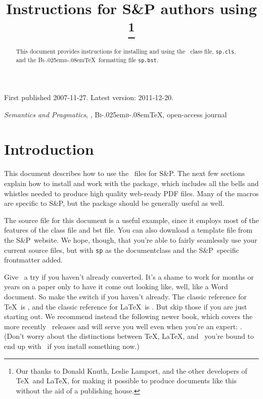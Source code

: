 \documentclass[lucida,final]{sp}
\title[S\&P instructions for \LaTeXe]{Instructions for S\&P authors using \LaTeXe%
  \thanks{Our thanks to Donald Knuth, Leslie
    Lamport, and the other developers of \TeX\ and \LaTeX, for making
    it possible to produce documents like this without the aid of a
    publishing house.}}
\author[von Fintel, Potts \& Shan]{%
  \spauthor{Kai von Fintel \\ \institute{Massachusetts Institute of Technology}} \AND
  \spauthor{Christopher Potts \\ \institute{University of Massachusetts Amherst}} \AND
  \spauthor{Chung-chieh Shan \\ \institute{Rutgers University}}%
}
\makeatletter
\newcommand{\BibTeX}{B{\textsc i\kern-.025em\textsc b}\kern-.08em\TeX}
\newcommand{\SandP}{S\&P\@}
\newcommand{\spfile}[1]{\texttt{#1}}
\makeatother
\begin{document}

\maketitle

\begin{mshistory}
First published 2007-11-27. Latest version: 2011-12-20.
\end{mshistory}

\begin{abstract}
  This document provides instructions for installing and using the
  \LaTeXe\ class file, \spfile{sp.cls}, and the \BibTeX\ formatting
  file \spfile{sp.bst}.
\end{abstract}

\begin{keywords}
  \emph{Semantics and Pragmatics}, \LaTeXe, \BibTeX, open-access journal
\end{keywords}


\section{Introduction}

This document describes how to use the \LaTeXe\ files for \SandP.  The
next few sections explain how to install and work with the package,
which includes all the bells and whistles needed to produce high
quality web-ready PDF files.  Many of the macros are specific to
\SandP, but the package should be generally useful as well.

The source file for this document is a useful example, since it
employs most of the features of the class file and bst file.  You can
also download a template file from the \SandP\ website.  We hope,
though, that you're able to fairly seamlessly use your current source
files, but with \spfile{sp} as the documentclass and the \SandP\
specific frontmatter added.

Give \LaTeXe\ a try if you haven't already converted.  It's a shame to
work for months or years on a paper only to have it come out looking
like, well, like a Word document.  So make the switch if you haven't
already.  The classic reference for \TeX\ is \citealt{Knuth84TeXBook},
and the classic reference for \LaTeX\ is \citealt{Lamport94}.  But
skip those if you are just starting out.  We recommend instead the
following newer book, which covers the more recently \LaTeXe\ releases
and will serve you well even when you're an expert:
\citealt{KopkaDaly03}.  (Don't worry about the distinctions between
\TeX, \LaTeX, and \LaTeXe\ \dash you're bound to end up with \LaTeXe\ if
you install something now.)
\end{document}

